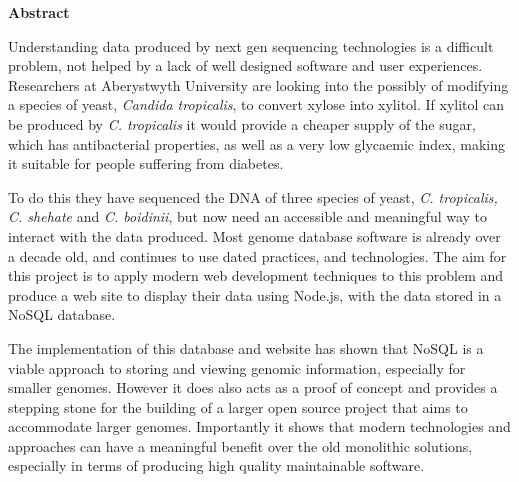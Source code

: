 \thispagestyle{empty}

\begin{center}
    {\LARGE\bf Abstract}
\end{center}

Understanding data produced by next gen sequencing technologies is a difficult problem, not helped by a lack of well designed software and user experiences. Researchers at Aberystwyth University are looking into the possibly of modifying a species of yeast, \textit{Candida tropicalis}, to convert xylose into xylitol.  If xylitol can be produced by \textit{C. tropicalis} it would provide a cheaper supply of the sugar, which has antibacterial properties, as well as a very low glycaemic index, making it suitable for people suffering from diabetes.

To do this they have sequenced the DNA of three species of yeast, \textit{C. tropicalis, C. shehate} and \textit{C. boidinii}, but now need an accessible and meaningful way to interact with the data produced. Most genome database software is already over a decade old, and continues to use dated practices, and technologies. The aim for this project is to apply modern web development techniques to this problem and produce a web site to display their data using Node.js, with the data stored in a NoSQL database. 

The implementation of this database and website has shown that NoSQL is a viable approach to storing and viewing genomic information, especially for smaller genomes. However it does also acts as a proof of concept and provides a stepping stone for the building of a larger open source project that aims to accommodate larger genomes. Importantly it shows that modern technologies and approaches can have a meaningful benefit over the old monolithic solutions, especially in terms of producing high quality maintainable software.
